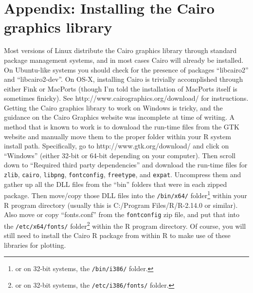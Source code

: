 \documentclass[12pt,oneside]{article}
\begin{document}
\section{Appendix: Installing the Cairo graphics library}
\label{sec:apx}
Most versions of Linux distribute the Cairo graphics library through standard package management systems, and in most cases Cairo will already be installed.  On Ubuntu-like systems you should check for the presence of packages “libcairo2” and “libcairo2-dev”.  On OS-X, installing Cairo is trivially accomplished through either Fink or MacPorts (though I'm told the installation of MacPorts itself is sometimes finicky).  See {\gurl http://www.cairographics.org/download/} for instructions.  Getting the Cairo graphics library to work on Windows is tricky, and the guidance on the Cairo Graphics website was incomplete at time of writing.  A method that is known to work is to download the run-time files from the GTK website and manually move them to the proper folder within your R system install path.  Specifically, go to {\gurl http://www.gtk.org/download/} and click on “Windows” (either 32-bit or 64-bit depending on your computer).  Then scroll down to “Required third party dependencies” and download the run-time files for \texttt{zlib}, \texttt{cairo}, \texttt{libpng}, \texttt{fontconfig}, \texttt{freetype}, and \texttt{expat}.  Uncompress them and gather up all the DLL files from the “bin” folders that were in each zipped package.  Then move/copy those DLL files into the \texttt{/bin/x64/} folder\footnote{or on 32-bit systems, the \texttt{/bin/i386/} folder.} within your R program directory (usually this is C:/Program Files/R/R-2.14.0 or similar).  Also move or copy “fonts.conf” from the \texttt{fontconfig} zip file, and put that into the \texttt{/etc/x64/fonts/} folder\footnote{or on 32-bit systems, the \texttt{/etc/i386/fonts/} folder.} within the R program directory.  Of course, you will still need to install the Cairo R package from within R to make use of these libraries for plotting.

\newpage

\end{document}
